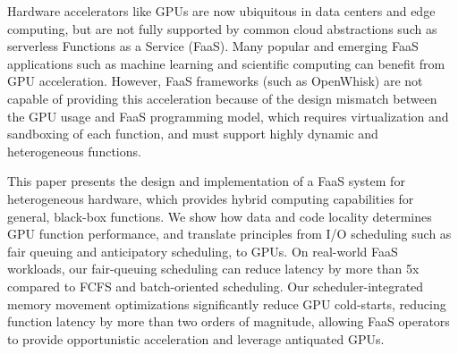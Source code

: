 Hardware accelerators like GPUs are now ubiquitous in data centers and edge computing, but are not fully supported by common cloud abstractions such as serverless Functions as a Service (FaaS).
Many popular and emerging FaaS applications such as machine learning and scientific computing  can benefit from GPU acceleration.
However, FaaS frameworks (such as OpenWhisk) are not capable of providing this acceleration because of the design mismatch between the GPU usage and FaaS programming model, which requires virtualization and sandboxing of each function, and must support highly dynamic and heterogeneous functions. 

This paper presents the design and implementation of a FaaS system for heterogeneous hardware, which provides hybrid computing capabilities for general, black-box functions.
We show how data and code locality determines GPU function performance, and translate principles from I/O scheduling such as fair queuing and anticipatory scheduling, to GPUs. 
On real-world FaaS workloads, our fair-queuing scheduling can reduce latency by more than 5x compared to FCFS and batch-oriented scheduling. 
Our scheduler-integrated memory movement optimizations significantly reduce GPU cold-starts, reducing function latency by more than two orders of magnitude, allowing FaaS operators to provide opportunistic acceleration and leverage antiquated GPUs. 

